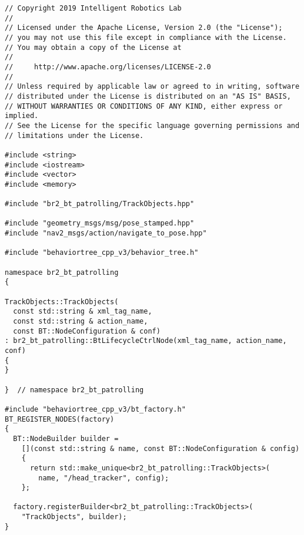  \footnotesize
\begin{tcolorbox}[sharp corners, colframe=gray!80, colback=LightGray, left=0pt, top=0pt, bottom=0pt, title=\texttt{br2\_bt\_patrolling/src/br2\_bt\_patrolling/TrackObjects.cpp}]
  \begin{verbatim}
// Copyright 2019 Intelligent Robotics Lab
//
// Licensed under the Apache License, Version 2.0 (the "License");
// you may not use this file except in compliance with the License.
// You may obtain a copy of the License at
//
//     http://www.apache.org/licenses/LICENSE-2.0
//
// Unless required by applicable law or agreed to in writing, software
// distributed under the License is distributed on an "AS IS" BASIS,
// WITHOUT WARRANTIES OR CONDITIONS OF ANY KIND, either express or implied.
// See the License for the specific language governing permissions and
// limitations under the License.

#include <string>
#include <iostream>
#include <vector>
#include <memory>

#include "br2_bt_patrolling/TrackObjects.hpp"

#include "geometry_msgs/msg/pose_stamped.hpp"
#include "nav2_msgs/action/navigate_to_pose.hpp"

#include "behaviortree_cpp_v3/behavior_tree.h"

namespace br2_bt_patrolling
{

TrackObjects::TrackObjects(
  const std::string & xml_tag_name,
  const std::string & action_name,
  const BT::NodeConfiguration & conf)
: br2_bt_patrolling::BtLifecycleCtrlNode(xml_tag_name, action_name, conf)
{
}

}  // namespace br2_bt_patrolling

#include "behaviortree_cpp_v3/bt_factory.h"
BT_REGISTER_NODES(factory)
{
  BT::NodeBuilder builder =
    [](const std::string & name, const BT::NodeConfiguration & config)
    {
      return std::make_unique<br2_bt_patrolling::TrackObjects>(
        name, "/head_tracker", config);
    };

  factory.registerBuilder<br2_bt_patrolling::TrackObjects>(
    "TrackObjects", builder);
}
    \end{verbatim}
    \end{tcolorbox}
  \normalsize

